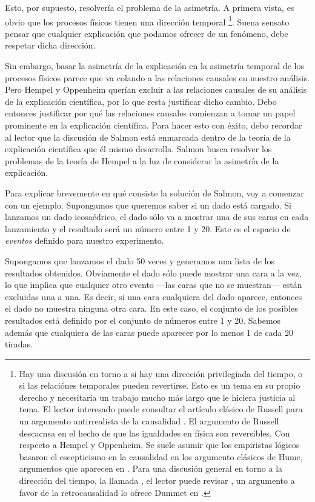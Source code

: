Esto, por supuesto, resolvería el problema de la asimetría. A primera
vista, es obvio que los procesos físicos tienen una dirección temporal
\footnote{
	Hay	una discusión en torno a si hay una dirección privilegiada del
	tiempo, o si las relaciónes temporales pueden revertirse. Esto es un
	tema en su propio derecho y necesitaría un trabajo mucho más largo
	que le hiciera justicia al tema. El lector interesado puede consultar
	el artículo clásico de Russell para un argumento antirrealista de la
	causalidad \parencite{onthecauserussell}. El argumento de Russell
	descacnsa en el hecho de que las igualdades en física son
	reversibles. Con respecto a Hempel y Oppenheim, Se suele asumir que
	los empiristas lógicos basaron el escepticismo en la causalidad en
	los argumento clásicos de Hume, argumentos que aparecen en
	\parencite{hume1784}. Para una discusión general en torno a la
	dirección del tiempo, la llamada , el lector
	puede revisar \parencite{utmArrowTime}, un argumento a favor de la
	retrocausalidad lo ofrece Dummet en \parencite{dummetcause}.
}.
Suena sensato pensar que cualquier explicación que podamos ofrecer de un
fenómeno, debe respetar dicha dirección.

Sin embargo, basar la asimetría de la explicación en la asimetría
temporal de los procesos físicos parece que va colando a las
relaciones causales en nuestro análisis. Pero Hempel y Oppenheim
querían excluir a las relaciones causales de su análisis de la
explicación científica, por lo que resta justificar dicho cambio.
Debo entonces justificar por qué las relaciones causales comienzan a
tomar un papel prominente en la explicación científica. Para hacer
esto con éxito, debo recordar al lector que la discusión de Salmon
está enmarcada dentro de la teoría de la explicación científica que
él mismo desarrolla. Salmon busca resolver los problemas de la teoría
de Hempel a la luz de considerar la asimetría de la explicación.

Para explicar brevemente en qué consiste la solución de Salmon, voy a
comenzar con un ejemplo. Supongamos que queremos saber si un dado
está cargado. Si lanzamos un dado icosaédrico, el dado sólo va a
mostrar una de sus caras en cada lanzamiento y el resultado será un
número entre 1 y 20. Este es el espacio de \emph{eventos} definido
para nuestro experimento.

Supongamos que lanzamos el dado 50 veces y generamos una lista de los
resultados obtenidos. Obviamente el dado sólo puede mostrar una cara
a la vez, lo que implica que cualquier otro evento ---las caras que
no se muestran--- están excluidas una a una. Es decir, si una cara
cualquiera del dado aparece, entonces el dado no muestra ninguna otra
cara. En este caso, el conjunto de los posibles resultados está
definido por el conjunto de números entre 1 y 20. Sabemos además que
cualquiera de las caras puede aparecer por lo menos 1 de cada 20
tiradas.

